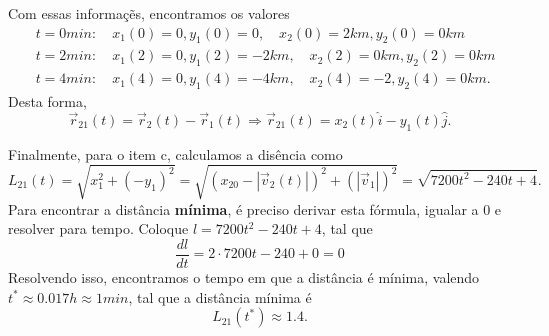 \documentclass[physics_notes.tex]{subfiles}
\begin{document}
\begin{example}
	Com essas informaç\~es, encontramos os valores
	\begin{align*}
		 & t = 0min:\quad x_{1}(0) = 0, y_{1}(0) = 0,\quad x_{2}(0) = 2km, y_{2}(0) = 0km    \\
		 & t = 2min:\quad x_{1}(2) = 0, y_{1}(2) = -2km,\quad x_{2}(2) = 0km, y_{2}(2) = 0km \\
		 & t = 4min:\quad x_{1}(4) = 0, y_{1}(4) = -4km,\quad x_{2}(4) = -2, y_{2}(4) = 0km.
	\end{align*}
	Desta forma,
	$$
		\vec{r}_{21}(t) = \vec{r}_{2}(t) - \vec{r}_{1}(t) \Rightarrow \vec{r}_{21}(t) = x_{2}(t)\hat{i} - y_{1}(t)\hat{j}.
	$$

	Finalmente, para o item c, calculamos a disência como
	$$
		L_{21}(t) = \sqrt{x_{1}^{2} + (-y_{1})^{2}} = \sqrt{(x_{20}-|\vec{v}_{2}(t)|)^{2} + (|\vec{v}_{1}|)^{2}} = \sqrt{7200t^{2} - 240t + 4}.
	$$
	Para encontrar a distância \textbf{mínima}, é preciso derivar esta fórmula, igualar a 0 e resolver para tempo. Coloque $l = 7200t^{2}-240t+4$,
	tal que
	$$
		\frac{dl}{dt} = 2 \cdot 7200t - 240 + 0 = 0
	$$
	Resolvendo isso, encontramos o tempo em que a distância é mínima, valendo $t^{*}\approx 0.017h\approx 1min$, tal que a distância mínima é
	$$
		L_{21}(t^{*})\approx 1.4.
	$$
\end{example}
\end{document}
